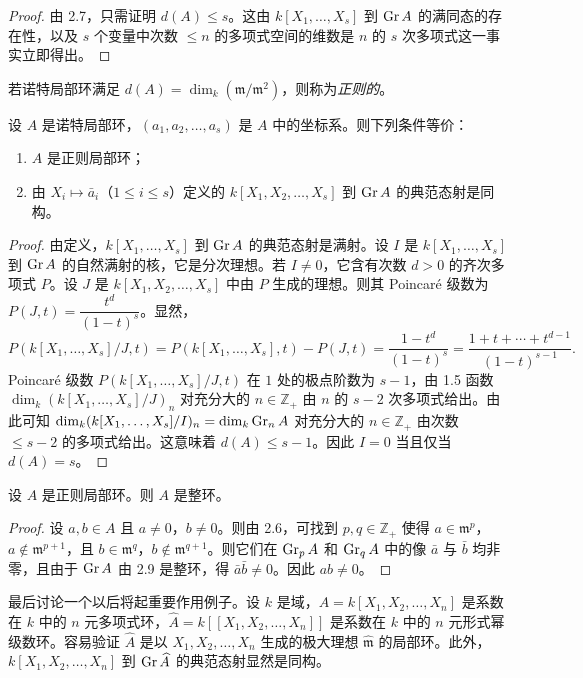 \begin{proof}
由 2.7，只需证明 $d(A)\le s$。这由 $k[X_1,\dots,X_s]$ 到 $\operatorname{Gr} A$ 的满同态的存在性，以及 $s$ 个变量中次数 $\le n$ 的多项式空间的维数是 $n$ 的 $s$ 次多项式这一事实立即得出。
\end{proof}

若诺特局部环满足 $d(A)=\dim_k(\mathfrak{m}/\mathfrak{m}^2)$，则称为\emph{正则的}。

\begin{theorem}
设 $A$ 是诺特局部环，$(a_1,a_2,\dots,a_s)$ 是 $A$ 中的坐标系。则下列条件等价：
\begin{enumerate}[label=(\roman*)]
  \item $A$ 是正则局部环；
  \item 由 $X_i\longmapsto \bar a_i$（$1\le i\le s$）定义的 $k[X_1,X_2,\dots,X_s]$ 到 $\operatorname{Gr} A$ 的典范态射是同构。
\end{enumerate}
\end{theorem}

\begin{proof}
由定义，$k[X_1,\dots,X_s]$ 到 $\operatorname{Gr} A$ 的典范态射是满射。设 $I$ 是 $k[X_1,\dots,X_s]$ 到 $\operatorname{Gr} A$ 的自然满射的核，它是分次理想。若 $I\neq 0$，它含有次数 $d>0$ 的齐次多项式 $P$。设 $J$ 是 $k[X_1,X_2,\dots,X_s]$ 中由 $P$ 生成的理想。则其 Poincaré 级数为 $P(J,t)=\dfrac{t^d}{(1-t)^s}$。显然，
$$P(k[X_1,\dots,X_s]/J,t)=P(k[X_1,\dots,X_s],t)-P(J,t)=\frac{1-t^d}{(1-t)^s}=\frac{1+t+\cdots+t^{d-1}}{(1-t)^{s-1}}.$$
Poincaré 级数 $P(k[X_1,\dots,X_s]/J,t)$ 在 $1$ 处的极点阶数为 $s-1$，由 1.5 函数 $\dim_k(k[X_1,\dots,X_s]/J)_n$ 对充分大的 $n\in\mathbb{Z}_+$ 由 $n$ 的 $s-2$ 次多项式给出。由此可知 $\dim_k(k[X_1,\dots,X_s]/I)_n=\dim_k\operatorname{Gr}_n A$ 对充分大的 $n\in\mathbb{Z}_+$ 由次数 $\le s-2$ 的多项式给出。这意味着 $d(A)\le s-1$。因此 $I=0$ 当且仅当 $d(A)=s$。
\end{proof}

\begin{theorem}
设 $A$ 是正则局部环。则 $A$ 是整环。
\end{theorem}

\begin{proof}
设 $a,b\in A$ 且 $a\neq 0$，$b\neq 0$。则由 2.6，可找到 $p,q\in\mathbb{Z}_+$ 使得 $a\in\mathfrak{m}^p$，$a\notin\mathfrak{m}^{p+1}$，且 $b\in\mathfrak{m}^q$，$b\notin\mathfrak{m}^{q+1}$。则它们在 $\operatorname{Gr}_p A$ 和 $\operatorname{Gr}_q A$ 中的像 $\bar a$ 与 $\bar b$ 均非零，且由于 $\operatorname{Gr} A$ 由 2.9 是整环，得 $\bar a\bar b\neq 0$。因此 $ab\neq 0$。
\end{proof}

最后讨论一个以后将起重要作用例子。设 $k$ 是域，$A=k[X_1,X_2,\dots,X_n]$ 是系数在 $k$ 中的 $n$ 元多项式环，$\widehat A=k[[X_1,X_2,\dots,X_n]]$ 是系数在 $k$ 中的 $n$ 元形式幂级数环。容易验证 $\widehat A$ 是以 $X_1,X_2,\dots,X_n$ 生成的极大理想 $\widehat{\mathfrak{m}}$ 的局部环。此外，$k[X_1,X_2,\dots,X_n]$ 到 $\operatorname{Gr}\widehat A$ 的典范态射显然是同构。

